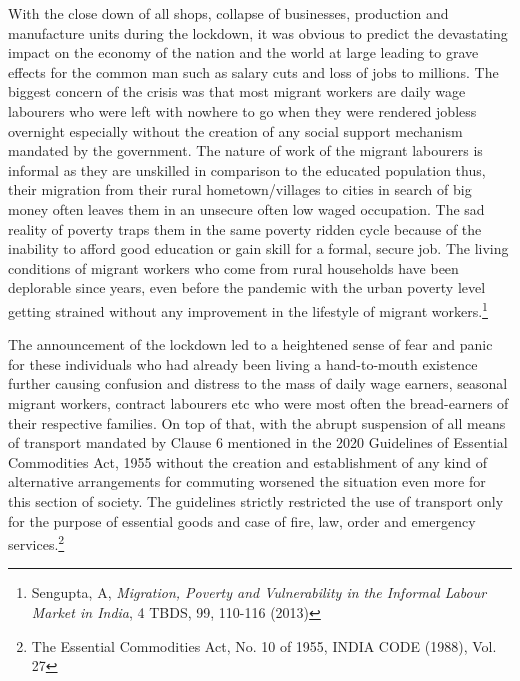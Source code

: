 \begin{multicols}{2}

\noi
With the close down of all shops, collapse of businesses, production and manufacture units
during the lockdown, it was obvious to predict the devastating impact on the economy of the
nation and the world at large leading to grave effects for the common man such as salary cuts
and loss of jobs to millions. The biggest concern of the crisis was that most migrant workers
are daily wage labourers who were left with nowhere to go when they were rendered jobless
overnight especially without the creation of any social support mechanism mandated by the
government. The nature of work of the migrant labourers is informal as they are unskilled in
comparison to the educated population thus, their migration from their rural
hometown/villages to cities in search of big money often leaves them in an unsecure often
low waged occupation. The sad reality of poverty traps them in the same poverty ridden cycle
because of the inability to afford good education or gain skill for a formal, secure job. The
living conditions of migrant workers who come from rural households have been deplorable
since years, even before the pandemic with the urban poverty level getting strained without
any improvement in the lifestyle of migrant workers.\footnote{Sengupta, A, \textit{Migration, Poverty and Vulnerability in the Informal Labour Market in India}, 4 TBDS, 99, 110-116 (2013)}

\vspace{-.15cm}

\noi
The announcement of the lockdown led to a heightened sense of fear and panic for these
individuals who had already been living a hand-to-mouth existence further causing confusion
and distress to the mass of daily wage earners, seasonal migrant workers, contract labourers
etc who were most often the bread-earners of their respective families. On top of that, with
the abrupt suspension of all means of transport mandated by Clause 6 mentioned in the 2020
Guidelines of Essential Commodities Act, 1955 without the creation and establishment of any
kind of alternative arrangements for commuting worsened the situation even more for this section of society. The guidelines strictly restricted the use of transport only for the purpose
of essential goods and case of fire, law, order and emergency services.\footnote{The Essential Commodities Act, No. 10 of 1955, INDIA CODE (1988), Vol. 27}

\vspace{-.15cm}


\end{multicols}
